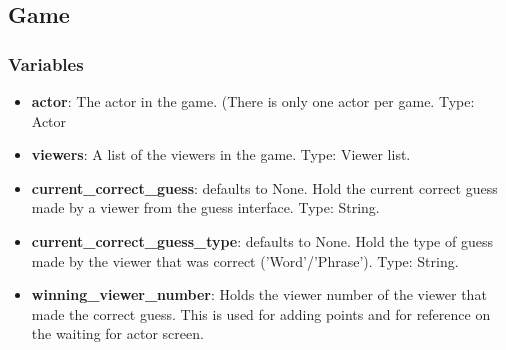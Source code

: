 \documentclass{article}
\begin{document}
\subsection{Game}
\subsubsection{Variables}
\begin{itemize}
	\item \textbf{actor}: The actor in the game. (There is only one actor per game. Type: Actor
	
	\item \textbf{viewers}: A list of the viewers in the game. Type: Viewer list.
	
	\item \textbf{current\_correct\_guess}: defaults to None. Hold the current correct guess made by a viewer from the guess interface. Type: String.
	
	\item \textbf{current\_correct\_guess\_type}: defaults to None. Hold the type of guess made by the viewer that was correct ('Word'/'Phrase'). Type: String. 
	
	\item \textbf{winning\_viewer\_number}: Holds the viewer number of the viewer that made the correct guess. This is used for adding points and for reference on the waiting for actor screen.
	
\end{itemize}
\end{document}
